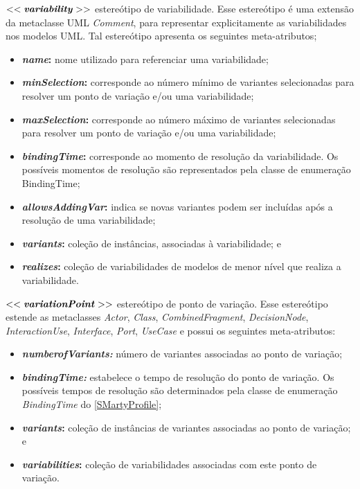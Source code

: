 $<<\textbf{\textit{variability}}>>$ estereótipo de variabilidade. Esse estereótipo é uma extensão da metaclasse UML \textit{Comment}, para representar explicitamente as variabilidades nos modelos UML. Tal estereótipo apresenta os seguintes meta-atributos;
\begin{itemize}
	\item \textbf{\textit{name}:} nome utilizado para referenciar uma variabilidade;
	\item \textbf{\textit{minSelection}:} corresponde ao número mínimo de variantes selecionadas para resolver um ponto de variação e/ou uma variabilidade;
	\item \textbf{\textit{maxSelection}:} corresponde ao número máximo de variantes selecionadas para resolver um ponto de variação e/ou uma variabilidade;
	\item \textbf{\textit{bindingTime}:} corresponde ao momento de resolução da variabilidade. Os possíveis momentos de resolução são representados pela classe de enumeração BindingTime;
	\item \textbf{\textit{allowsAddingVar}:} indica se novas variantes podem ser incluídas após a resolução de uma variabilidade;
	\item \textbf{\textit{variants}:} coleção de instâncias, associadas à variabilidade; e
	\item \textbf{\textit{realizes}:} coleção de variabilidades de modelos de menor nível que realiza a variabilidade.
\end{itemize}

$<<\textbf{\textit{variationPoint}}>>$ estereótipo de ponto de variação. Esse estereótipo estende as metaclasses \textit{Actor}, \textit{Class}, \textit{CombinedFragment}, \textit{DecisionNode}, \textit{InteractionUse}, \textit{Interface}, \textit{Port}, \textit{UseCase} e possui os seguintes meta-atributos:
\begin{itemize}
	\item \textbf{\textit{numberofVariants:}} número de variantes associadas ao ponto de variação;
	\item \textbf{\textit{bindingTime:}} estabelece o tempo de resolução do ponto de variação.  Os possíveis tempos de resolução são determinados pela classe de enumeração \textit{BindingTime} do \ref{SMartyProfile};
	\item \textbf{\textit{variants}:} coleção de instâncias de variantes associadas ao ponto de variação; e
	\item \textbf{\textit{variabilities}:} coleção de variabilidades associadas com este ponto de variação.
\end{itemize}

